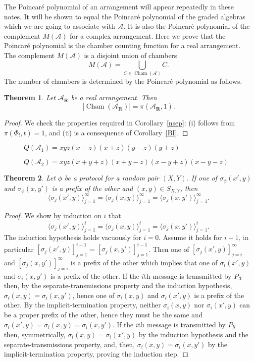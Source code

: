 \documentclass{article}
\newtheorem{thm}{Theorem}[section]
\theoremstyle{definition}
\theoremstyle{remark}
\newcommand{\A}{\mathcal{A}}
\newcommand{\st}{\sigma}
\newcommand{\XcY}{{(X,Y)}}
\newcommand{\SXY}{{S_{X,Y}}}
\newcommand{\PY}{{P_{\mathcal{Y}}}}
\newcommand{\X}{\mathcal{X}}
\DeclareMathOperator{\Cham}{Cham}
\newcommand{\envert}[1]{\left\lvert#1\right\rvert}
\let\abs=\envert
\begin{document}
The Poincar\'e polynomial of an arrangement
will appear repeatedly
in these notes. It will be shown to equal the
Poincar\'e polynomial
of the graded algebras which we are going to
associate with $\A$. It is also the Poincar\'e
polynomial of the complement $M(\A)$ for a
complex arrangement. Here we prove
that the Poincar\'e polynomial is the chamber
counting function for a real arrangement. The
complement $M(\A)$ is a disjoint union of chambers
\[M(\A) = \bigcup_{C \in \Cham(\A)} C.\]
The number
of chambers is determined by the Poincar\'e
polynomial as follows.

\begin{thm}\label{th-realarr}
Let $\A_{\mathbf{R}}$ be a real arrangement. Then
\[ \abs{\Cham(\A_{\mathbf{R}})} = \pi (\A_{\mathbf{R}},1). \]
\end{thm}

\begin{proof}
We check the properties required in Corollary~\ref{nsep}:
(i) follows from $\pi (\Phi_{ l},t) = 1$, and (ii) is a
consequence of Corollary~\ref{BI}.
\end{proof}

\begin{figure}
\vspace{5cm}
\caption[]{$Q(\A_{1}) = xyz(x-z)(x+z)(y-z)(y+z)$}
\end{figure}

\begin{figure}
\vspace{5cm}
\caption[]{$Q(\A_{2})= xyz(x+y+z)(x+y-z)(x-y+z)(x-y-z)$}
\end{figure}


\begin{thm}
\label{T_first_the_int}
Let $\phi$ be a protocol for a random pair $\XcY$.
If one of $\st_\phi(x',y)$ and $\st_\phi(x,y')$ is a prefix of the other
and $(x,y)\in\SXY$, then
\[
\langle \st_j(x',y)\rangle_{j=1}^\infty
=\langle \st_j(x,y)\rangle_{j=1}^\infty
=\langle \st_j(x,y')\rangle_{j=1}^\infty .
\]
\end{thm}
\begin{proof}
We show by induction on $i$ that
\[
\langle \st_j(x',y)\rangle_{j=1}^i
=\langle \st_j(x,y)\rangle_{j=1}^i
=\langle \st_j(x,y')\rangle_{j=1}^i.
\]
The induction hypothesis holds vacuously for $i=0$. Assume it holds for
$i-1$, in particular
$[\st_j(x',y)]_{j=1}^{i-1}=[\st_j(x,y')]_{j=1}^{i-1}$. Then one of
$[\st_j(x',y)]_{j=i}^{\infty}$ and $[\st_j(x,y')]_{j=i}^{\infty}$ is a
prefix of the other which implies that one of $\st_i(x',y)$ and
$\st_i(x,y')$ is a prefix of the other. If the $i$th message is
transmitted by $P_\X$ then, by the separate-transmissions property and
the induction hypothesis, $\st_i(x,y)=\st_i(x,y')$, hence one of
$\st_i(x,y)$ and $\st_i(x',y)$ is a prefix of the other. By the
implicit-termination property, neither $\st_i(x,y)$ nor $\st_i(x',y)$
can be a proper prefix of the other, hence they must be the same and
$\st_i(x',y)=\st_i(x,y)=\st_i(x,y')$. If the $i$th message is
transmitted by $\PY$ then, symmetrically, $\st_i(x,y)=\st_i(x',y)$ by
the induction hypothesis and the separate-transmissions property, and,
then, $\st_i(x,y)=\st_i(x,y')$ by the implicit-termination property,
proving the induction step.
\end{proof}
\end{document}
